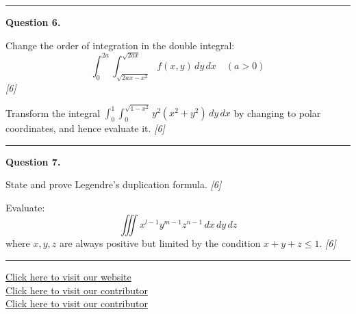 \documentclass[11pt,a4paper]{article}
\newcommand{\pts}[1]{\hfill   \textit{[#1]}}
\begin{document}
\medskip\rule{\linewidth}{0.2pt}

\medskip


\noindent   \textbf{Question 6.}

\begin{parts}
  \item Change the order of integration in the double integral:
  \[
  \int_0^{2a} \int_{\sqrt{2ax-x^2}}^{\sqrt{2ax}} f(x,y) \, dy \, dx \quad (a > 0)
  \] \pts{6}
  \item Transform the integral $\int_0^1 \int_0^{\sqrt{1-x^2}} y^2 (x^2+y^2) \, dy \, dx$ by changing to polar coordinates, and hence evaluate it. \pts{6}
\end{parts}

\medskip\rule{\linewidth}{0.2pt}

\medskip


\noindent   \textbf{Question 7.}

\begin{parts}
  \item State and prove Legendre's duplication formula. \pts{6}
  \item Evaluate:
  \[
  \iiint x^{l-1} y^{m-1} z^{n-1} \, dx \, dy \, dz
  \]
  where $x, y, z$ are always positive but limited by the condition $x+y+z \le 1$. \pts{6}
\end{parts}

\vfill
\rule{\linewidth}{0.4pt}

\begin{center}\small
  \href{https://bhu-exam.vercel.app/}{Click here to visit our website}\\[4pt]
  \href{https://me-aryan.vercel.app/}{Click here to visit our contributor}\\[4pt]
  \href{https://quashan-me.vercel.app/}{Click here to visit our contributor}
\end{center}
\end{document}
